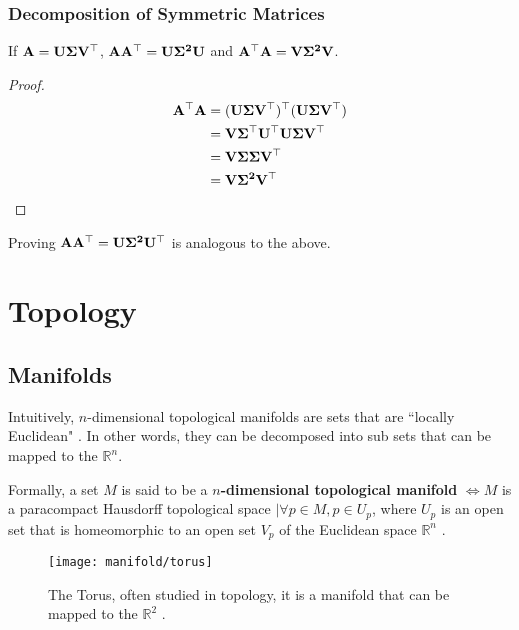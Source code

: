 \subsubsection{Decomposition of Symmetric Matrices}
	\label{th:svd-aat}
	If $\mathbf{A} = \mathbf{U \Sigma V^\top}$, $\mathbf{AA^\top} = \mathbf{U \Sigma^2 U}$ and $\mathbf{A^\top A} = \mathbf{V \Sigma^2 V}$.
\begin{proof}
	\begin{align*}
	\mathbf{A^\top A} &= (\mathbf{U\Sigma V^\top})^\top (\mathbf{U\Sigma V^\top}) \\
	&= \mathbf{V \Sigma^\top U^\top U \Sigma V^\top} \\
	&= \mathbf{V \Sigma \Sigma V^\top} \\
	&= \mathbf{V \Sigma^2 V^\top}
	\end{align*}
\end{proof}

Proving $\mathbf{AA^\top} = \mathbf{U \Sigma^2 U^\top}$ is analogous to the above.

\section{Topology}
\subsection{Manifolds}

Intuitively, $n$-dimensional topological manifolds are sets that are ``locally Euclidean" \cite{lee2009}. In other words, they can be decomposed into sub sets that can be mapped to the $\mathbb{R}^n$.

Formally, a set $M$ is said to be a \textbf{$n$-dimensional topological manifold} $\iff M$ is a paracompact Hausdorff topological space $\mid \forall p \in M, p \in U_p$, where $U_p$ is an open set that is homeomorphic to an open set $V_p$ of the Euclidean space $\mathbb{R}^n$ \cite{lee2009}.

\begin{figure}[H]
	\centering
	\captionsetup{justification=centering}
	\texttt{[image: manifold/torus]}
	\caption{The Torus, often studied in topology, it is a manifold that can be mapped to the $\mathbb{R}^2$ \protect\footnotemark.}
	\label{fig:mani_torus}
\end{figure}


